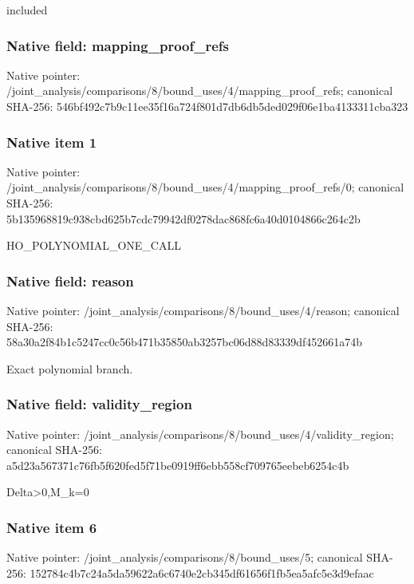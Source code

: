 \documentclass[10pt,a4paper]{article}
\begin{document}
\begingroup\raggedright\sloppy included\par\endgroup

\subsubsection{Native field: mapping\_\allowbreak{}proof\_\allowbreak{}refs}
Native pointer: /joint\_\allowbreak{}analysis/comparisons/8/bound\_\allowbreak{}uses/4/mapping\_\allowbreak{}proof\_\allowbreak{}refs; canonical SHA-256: 546bf492c7b9c11ee35f16a724f801d7db6db5ded029f06e1ba4133311cba323

\subsubsection{Native item 1}
Native pointer: /joint\_\allowbreak{}analysis/comparisons/8/bound\_\allowbreak{}uses/4/mapping\_\allowbreak{}proof\_\allowbreak{}refs/0; canonical SHA-256: 5b135968819c938cbd625b7cdc79942df0278dac868fc6a40d0104866c264c2b

\begingroup\raggedright\sloppy HO\_\allowbreak{}POLYNOMIAL\_\allowbreak{}ONE\_\allowbreak{}CALL\par\endgroup

\subsubsection{Native field: reason}
Native pointer: /joint\_\allowbreak{}analysis/comparisons/8/bound\_\allowbreak{}uses/4/reason; canonical SHA-256: 58a30a2f84b1c5247cc0c56b471b35850ab3257bc06d88d83339df452661a74b

\begingroup\raggedright\sloppy Exact polynomial branch.\par\endgroup

\subsubsection{Native field: validity\_\allowbreak{}region}
Native pointer: /joint\_\allowbreak{}analysis/comparisons/8/bound\_\allowbreak{}uses/4/validity\_\allowbreak{}region; canonical SHA-256: a5d23a567371c76fb5f620fed5f71be0919ff6ebb558cf709765eebeb6254c4b

\begingroup\raggedright\sloppy Delta>0,\allowbreak{}M\_\allowbreak{}k=\allowbreak{}0\par\endgroup

\subsubsection{Native item 6}
Native pointer: /joint\_\allowbreak{}analysis/comparisons/8/bound\_\allowbreak{}uses/5; canonical SHA-256: 152784c4b7c24a5da59622a6c6740e2cb345df61656f1fb5ea5afc5e3d9efaac
\end{document}
